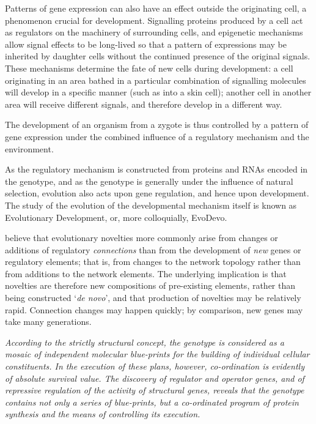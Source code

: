 Patterns of gene expression can also have an effect outside the originating cell, a phenomenon crucial for development. Signalling proteins produced by a cell act as regulators on the machinery of surrounding cells, and epigenetic mechanisms allow signal effects to be long-lived so that a pattern of expressions may be inherited by daughter cells without the continued presence of the original signals. These mechanisms determine the fate of new cells during development: a cell originating in an area bathed in a particular combination of signalling molecules will develop in a specific manner (such as into a skin cell); another cell in another area will receive different signals, and therefore develop in a different way.

The development of an organism from a zygote is thus controlled by a pattern of gene expression under the combined influence of a regulatory mechanism and the environment.

As the regulatory mechanism is constructed from proteins and RNAs encoded in the genotype, and as the genotype is generally under the influence of natural selection, evolution also acts upon gene regulation, and hence upon development. The study of the evolution of the developmental mechanism itself is known as Evolutionary Development, or, more colloquially, EvoDevo.

\parencite{Prudhomme:2007ax} believe that evolutionary novelties more commonly arise from changes or additions of regulatory \emph{connections} than from the development of \emph{new} genes or regulatory elements; that is, from changes to the network topology rather than from additions to the network elements. The underlying implication is that novelties are therefore new compositions of
pre-existing elements, rather than being constructed `\emph{de novo}', and that production of novelties may be relatively rapid. Connection changes may happen quickly; by comparison, new genes may take many generations.

\begin{flushright}
	\emph{According to the strictly structural concept, the genotype is considered as a mosaic of independent molecular blue-prints for the building of individual cellular constituents. In the execution of these plans, however, co-ordination is evidently of absolute survival value. The discovery of regulator and operator genes, and of repressive regulation of the activity of structural genes, reveals that the genotype contains not only a series of blue-prints, but a co-ordinated program of protein synthesis and the means of controlling its execution.}
	\par\cite[p354]{Jacob:1961ys}
\end{flushright}

